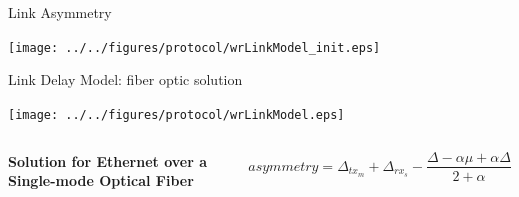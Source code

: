 \documentclass[compress,red]{beamer}
\begin{document}
\begin{frame}{Link Asymmetry}

  \begin{center}
  \texttt{[image: ../../figures/protocol/wrLinkModel\_init.eps]}
  \end{center}

\end{frame}
\begin{frame}{Link Delay Model: fiber optic solution}

  \begin{center}
  \texttt{[image: ../../figures/protocol/wrLinkModel.eps]}
  \end{center}

  \begin{columns}[c]
  \column{1.5in}

    \begin{center}
      \textbf{Solution for Ethernet over a Single-mode Optical Fiber}
    \end{center}    

  \column{2.7in}

    \begin{equation}
      \nonumber asymmetry = \Delta_{tx_m} + \Delta_{rx_s} - \frac{\Delta - \alpha \mu + \alpha \Delta}{2 + \alpha}
    \end{equation}

  \end{columns}

\end{frame}
\end{document}
